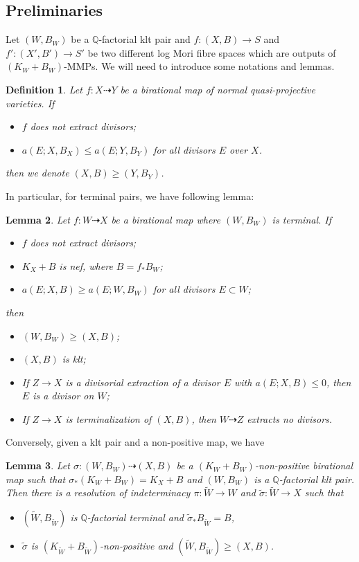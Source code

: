\documentclass[11pt]{amsart}
\newtheorem{defn}{Definition}[section]
\newtheorem{lem}[defn]{Lemma}
\begin{document}
\subsection{Preliminaries}
Let $(W,B_W)$ be a $\mathbb{Q}$-factorial klt pair and $f:(X,B)\to S$ and $f':(X',B')\to S'$ be two different log Mori fibre spaces which are outputs of $(K_{W}+B_{W})$-MMPs.  We will need to introduce some notations and lemmas.
\begin{defn}
Let $f:X\dashrightarrow Y$ be a birational map of normal quasi-projective varieties. If
\begin{itemize}
  \item $f$ does not extract divisors;
  \item $a(E;X,B_{X})\leqslant a(E;Y,B_{Y})$ for all divisors  $E$  over $X$.
\end{itemize}
then we denote $(X,B)\geqslant (Y,B_{Y})$.
\end{defn}
In particular, for terminal pairs, we have following lemma: 
\begin{lem}\label{terminalorder}
\cite[Lemma 13.8]{haconMinimalModelProgram2012} Let $f:W\dashrightarrow X$ be a birational map where $(W,B_W)$ is terminal. If
\begin{itemize}
  \item $f$ does not extract divisors;
  \item $K_X+B$ is nef, where $B=f_*B_W$;
  \item $a(E;X,B)\geqslant a(E;W,B_W)$ for all divisors $E \subset W$;
\end{itemize}
then
\begin{itemize}
  \item $(W,B_W)\geqslant (X,B)$;
  \item $(X,B)$ is klt;
  \item If $Z\to X$ is a divisorial extraction of a divisor $E$ with $a(E;X,B)\leqslant 0$, then $E$ is a divisor on $W$;
  \item If $Z\to X$ is terminalization of $(X,B)$, then $W\dashrightarrow Z$ extracts no divisors.
\end{itemize}
\end{lem}
Conversely, given a klt pair and a non-positive map, we have
\begin{lem}\label{terminalresolution}
  \cite[Lemma 3.5]{liuSarkisovProgramGeneralized2021} Let $\sigma:(W,B_W)\dashrightarrow (X,B)$ be a $(K_W+B_W)$-non-positive birational map such that $\sigma_*(K_W+B_W)=K_X+B$ and $(W,B_W)$ is a $\mathbb{Q}$-factorial klt pair. Then there is a resolution of indeterminacy $\pi:\tilde{W}\to W $ and $\tilde{\sigma}:\tilde{W}\to X$ such that
\begin{itemize}
  \item $(\tilde{W},B_{\tilde{W}})$ is $\mathbb{Q}$-factorial terminal and $\tilde{\sigma}_*B_{\tilde{W}}=B$,
  \item $\tilde{\sigma}$ is $(K_{\tilde{W}}+B_{\tilde{W}})$-non-positive and $(\tilde{W},B_{\tilde{W}})\geqslant (X,B)$.
\end{itemize}
\end{lem}
\end{document}
